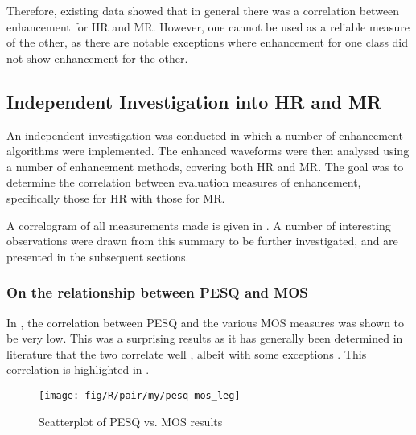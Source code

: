 Therefore, existing data showed that in general there was a correlation
between enhancement for \ac{HR} and \ac{MR}. However, one cannot
be used as a reliable measure of the other, as there are notable exceptions
where enhancement for one class did not show enhancement for the other.

\clearpage{}


\subsection{Independent Investigation into \acl{HR} and \acl{MR}}

An independent investigation was conducted in which a number of enhancement
algorithms were implemented. The enhanced waveforms were then analysed
using a number of enhancement methods, covering both \ac{HR} and
\ac{MR}. The goal was to determine the correlation between evaluation
measures of enhancement, specifically those for \ac{HR} with those
for \ac{MR}.

A correlogram of all measurements made is given in .
A number of interesting observations were drawn from this summary
to be further investigated, and are presented in the subsequent sections.


\subsubsection*{On the relationship between \acs{PESQ} and \acs{MOS}}

In , the correlation between \ac{PESQ} and the various
\ac{MOS} measures was shown to be very low. This was a surprising
results as it has generally been determined in literature that the
two correlate well \cite{Kitawaki2007,Rix2003,Rix2001}, albeit with
some exceptions \cite{Liu2006}. This correlation is highlighted
in .

\begin{figure}[bh]

\texttt{[image: fig/R/pair/my/pesq-mos\_leg]}

\protect\caption{\label{fig:my-pesq-mos}Scatterplot of \acs{PESQ} vs. \acs{MOS}
results}
\end{figure}



